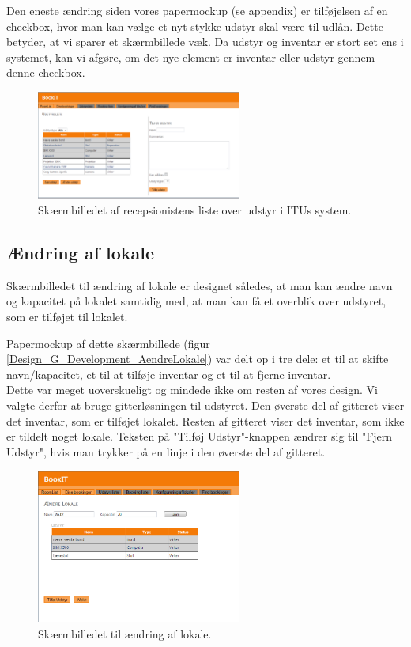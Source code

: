 Den eneste ændring siden vores papermockup (se appendix) er tilføjelsen af en checkbox, hvor man kan vælge et nyt stykke udstyr skal være til udlån. Dette betyder, at vi sparer et skærmbillede væk. Da udstyr og inventar er stort set ens i systemet, kan vi afgøre, om det nye element er inventar eller udstyr gennem denne checkbox.

\begin{figure}[h!]
  \centering
    \includegraphics[width=0.6\textwidth]{Appendix/GUI-Prototype/DigitalMockup/UdstyrsListe}
  \caption{Skærmbilledet af recepsionistens liste over udstyr i ITUs system.}
\label{Design_G_Development_UdstyrsListe_Final}
\end{figure} 

\subsection{Ændring af lokale}
Skærmbilledet til ændring af lokale er designet således, at man kan ændre navn og kapacitet på lokalet samtidig med, at man kan få et overblik over udstyret, som er tilføjet til lokalet.

Papermockup af dette skærmbillede (figur \ref{Design_G_Development_AendreLokale}) var delt op i tre dele: et til at skifte navn/kapacitet, et til at tilføje inventar og et til at fjerne inventar.
\\Dette var meget uoverskueligt og mindede ikke om resten af vores design. Vi valgte derfor at bruge gitterløsningen til udstyret. Den øverste del af gitteret viser det inventar, som er tilføjet lokalet. Resten af gitteret viser det inventar, som ikke er tildelt noget lokale. Teksten på "Tilføj Udstyr"-knappen ændrer sig til "Fjern Udstyr", hvis man trykker på en linje i den øverste del af gitteret.

\begin{figure}[h!]
  \centering
    \includegraphics[width=0.6\textwidth]{Appendix/GUI-Prototype/DigitalMockup/AendreLokale}
  \caption{Skærmbilledet til ændring af lokale.}
\label{Design_G_Development_AendreLokale_Final}
\end{figure} 

